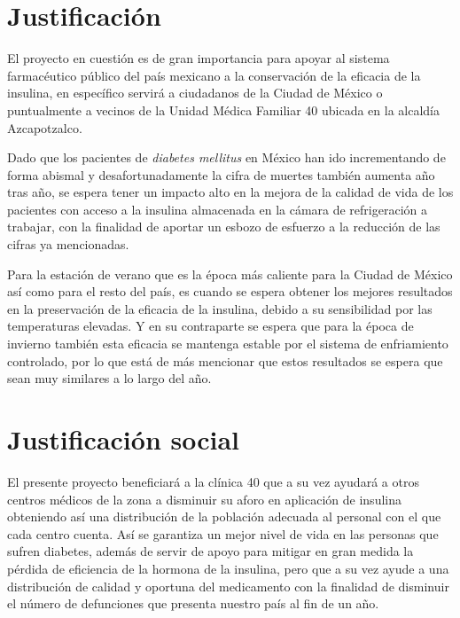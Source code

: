\newpage
\section*{Justificación}


El proyecto en cuestión es de gran importancia para apoyar al sistema farmacéutico público del país mexicano a la conservación de la eficacia de la insulina, en específico  servirá a ciudadanos de la Ciudad de México o puntualmente a vecinos de la Unidad Médica Familiar 40 ubicada en la alcaldía Azcapotzalco.

Dado que los pacientes de \textit{diabetes mellitus} en México han ido incrementando de forma abismal y desafortunadamente la cifra de muertes también aumenta año tras año, se espera tener un impacto alto en la mejora de la calidad de vida de los pacientes con acceso a la insulina almacenada en la cámara de refrigeración a trabajar, con la finalidad de aportar un esbozo de esfuerzo a la reducción de las cifras ya mencionadas.

Para la estación de verano que es la época más caliente para la Ciudad de 
México así como para el resto del país, es cuando se espera obtener los mejores resultados en la preservación de la eficacia de la insulina, debido a su sensibilidad por las temperaturas elevadas. Y en su contraparte se espera que para la época de invierno también esta eficacia se mantenga estable por el sistema de enfriamiento controlado, por lo que está de más mencionar que estos resultados se espera que sean muy similares a lo largo del año. 



\section*{Justificación social}

El presente proyecto beneficiará a la clínica 40 que a su vez ayudará a otros centros médicos de la zona a disminuir su aforo en aplicación de insulina obteniendo así una distribución de la población adecuada al personal con el que cada centro cuenta. Así se garantiza un mejor nivel de vida en las personas que sufren diabetes, además de servir de apoyo para mitigar en gran medida la pérdida de eficiencia de la hormona de la insulina, pero que a su vez ayude a una distribución de calidad y oportuna del medicamento con la finalidad de disminuir el número de defunciones que presenta nuestro país al fin de un año.

